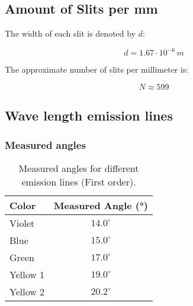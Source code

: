    \subsection{Amount of Slits per mm}

        The width of each slit is denoted by \( d \):
        
        \begin{equation}
            d = 1.67 \cdot 10^{-6} \, m
            \label{eq:WidthSlit}
        \end{equation}
        
        The approximate number of slits per millimeter is:

        \begin{equation}
            N \approx 599
            \label{eq:SlitCount}
        \end{equation}
        
    \subsection{Wave length emission lines}
        \subsubsection{Measured angles}
            \begin{table}[H]
                \centering
                \renewcommand{\arraystretch}{1.3}
                \begin{tabular}{l|c}
                    \textbf{Color} & \textbf{Measured Angle (°)} \\
                    \hline
                    Violet & $14.0^\circ$ \\
                    Blue & $15.0^\circ$ \\
                    Green & $17.0^\circ$ \\
                    Yellow 1 & $19.0^\circ$ \\
                    Yellow 2 & $20.2^\circ$ \\
                \end{tabular}
                \caption{Measured angles for different emission lines (First order).}
            \end{table}

